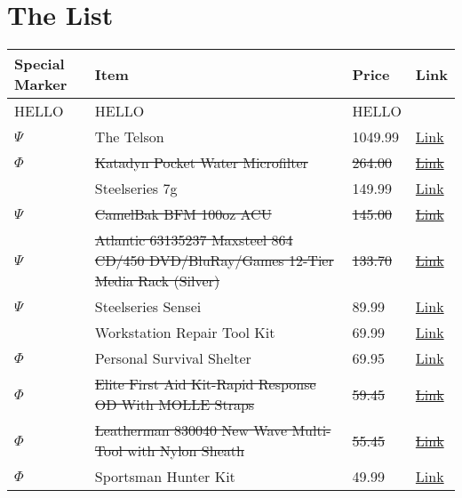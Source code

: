 \documentclass[12pt]{article}
\begin{document}
\section*{The List}
\begin{longtable}{ | p{1.3cm} | p{12cm} | l | l |}
\hline
Special Marker & Item & Price & Link \\
\hline
HELLO & HELLO & HELLO \\
$\Psi$ & The Telson & 1049.99 & \href{http://www.scorpyd.com/store.html}{Link} \\
\sout{$\Phi$} & \sout{Katadyn Pocket Water Microfilter} & \sout{264.00} & \href{http://www.amazon.com/Katadyn-8013618-Pocket-Water-Microfilter/dp/B0007U00YE/ref=wl_it_dp_o_npd?ie=UTF8&coliid=I303G9NWK6X6AR&colid=8BFL6AZQK4C2}{\sout{Link}} \\
& Steelseries 7g  &  149.99 & \href{http://shop.steelseries.com/us/keyboards/steelseries-7g.html}{Link} \\
\sout{$\Psi$} & \sout{CamelBak BFM 100oz ACU} & \sout{145.00} & \href{http://www.amazon.com/CamelBak-61070-BFM-100oz-ACU/dp/B002QW7D8M/ref=sr_1_6?ie=UTF8&qid=1323054264&sr=8-6}{\sout{Link}} \\
\sout{$\Psi$} & \sout{Atlantic 63135237 Maxsteel 864 CD/450 DVD/BluRay/Games 12-Tier Media Rack (Silver)} & \sout{133.70} & \href{http://www.amazon.com/Atlantic-63135237-Maxsteel-BluRay-12-Tier/dp/B000A0FXCK}{\sout{Link}} \\
$\Psi$ & Steelseries Sensei  & 89.99 & \href{http://shop.steelseries.com/us/mice/steelseries-sensei.html}{Link} \\
& Workstation Repair Tool Kit & 69.99 & \href{http://www.thinkgeek.com/gadgets/tools/7048/}{Link} \\
$\Phi$ & Personal Survival Shelter & 69.95 & \href{http://wildernessinnovation.com/survival-supplies/survival-items/personal-survival-shelter/}{Link} \\
\sout{$\Phi$} & \sout{Elite First Aid Kit-Rapid Response OD With MOLLE Straps} & \sout{59.45} & \href{http://www.amazon.com/Elite-Kit-Rapid-Response-Wrapped-Contains/dp/B005G2GXOE/ref=sr_1_1?s=outdoor-recreation&ie=UTF8&qid=1323051713&sr=1-1}{\sout{Link}} \\
\sout{$\Phi$} & \sout{Leatherman 830040 New Wave Multi-Tool with Nylon Sheath} & \sout{55.45} & \href{http://www.amazon.com/Leatherman-830040-Multi-Tool-Nylon-Sheath/dp/B0002H49BM/ref=sr_1_1?s=hi&ie=UTF8&qid=1323051941&sr=1-1}{\sout{Link}} \\
$\Phi$ & Sportsman Hunter Kit & 49.99 & \href{http://www.amazon.com/Shepherd-Survival-Supply-Sportsman-Hunter/dp/B0055S6LQO/ref=sr_1_3?s=sporting-goods&ie=UTF8&qid=1324836457&sr=1-3}{Link} \\

\end{longtable}
\end{document}

